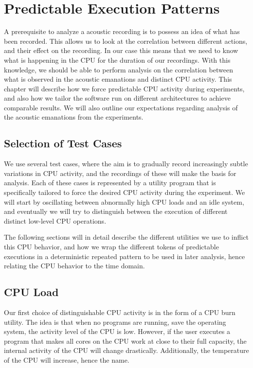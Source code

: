 \chapter{Predictable Execution Patterns}\label{chp4:predictable_execution} 
A prerequisite to analyze a acoustic recording is to possess an idea of what has been recorded. 
This allows us to look at the correlation between different actions, and their effect on the recording.
In our case this means that we need to know what is happening in the \gls{CPU} for the duration of our recordings.
With this knowledge, we should be able to perform analysis on the correlation between what is observed in the acoustic emanations and distinct \gls{CPU} activity.
This chapter will describe how we force predictable \gls{CPU} activity during experiments, and also how we tailor the software run on different architectures to achieve comparable results.
We will also outline our expectations regarding analysis of the acoustic emanations from the experiments.

\section{Selection of Test Cases}
We use several test cases, where the aim is to gradually record increasingly subtle variations in \gls{CPU} activity, and the recordings of these will make the basis for analysis.
Each of these cases is represented by a utility program that is specifically tailored to force the desired \gls{CPU} activity during the experiment.
We will start by oscillating between abnormally high \gls{CPU} loads and an idle system, and eventually we will try to distinguish between the execution of different distinct low-level \gls{CPU} operations.

The following sections will in detail describe the different utilities we use to inflict this \gls{CPU} behavior, and how we wrap the different tokens of predictable executions in a deterministic repeated pattern to be used in later analysis, hence relating the \gls{CPU} behavior to the time domain.

\section{CPU Load}\label{chp4:sec:cpu_load}
Our first choice of distinguishable \gls{CPU} activity is in the form of a \gls{CPU} burn utility. 
The idea is that when no programs are running, save the operating system, the activity level of the \gls{CPU} is low. 
However, if the user executes a program that makes all cores on the \gls{CPU} work at close to their full capacity, the internal activity of the \gls{CPU} will change drastically.
Additionally, the temperature of the \gls{CPU} will increase, hence the name.

